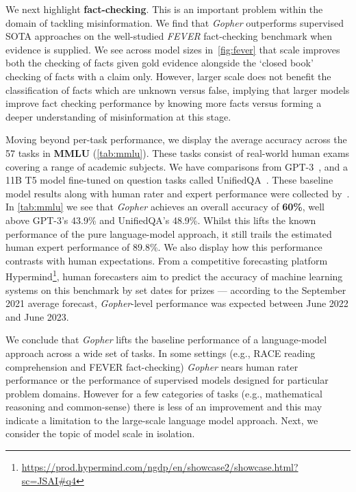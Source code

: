 We next highlight \textbf{fact-checking}. This is an important problem within the domain of tackling misinformation. We find that \textit{Gopher} outperforms supervised SOTA approaches on the well-studied \textit{FEVER} fact-checking benchmark when evidence is supplied. We see across model sizes in~\autoref{fig:fever} that scale improves both the checking of facts given gold evidence alongside the `closed book' checking of facts with a claim only. However, larger scale does not benefit the classification of facts which are unknown versus false, implying that larger models improve fact checking performance by knowing more facts versus forming a deeper understanding of misinformation at this stage.

Moving beyond per-task performance, we display the average accuracy across the 57 tasks in \textbf{MMLU} (\autoref{tab:mmlu}). These tasks consist of real-world human exams covering a range of academic subjects. We have comparisons from GPT-3~\citep{gpt3}, and a 11B T5 model fine-tuned on question tasks called UnifiedQA~\citep{khashabi2020unifiedqa}. These baseline model results along with human rater and expert performance were collected by~\citet{hendrycks2020measuring}. In \autoref{tab:mmlu} we see that \textit{Gopher} achieves an overall accuracy of \textbf{60\%}, well above GPT-3's 43.9\% and UnifiedQA's 48.9\%.
Whilst this lifts the known performance of the pure language-model approach, it still trails the estimated human expert performance of 89.8\%. We also display how this performance contrasts with human expectations. From a competitive forecasting platform Hypermind\footnote{\url{https://prod.hypermind.com/ngdp/en/showcase2/showcase.html?sc=JSAI\#q4}}, human forecasters aim to predict the accuracy of machine learning systems on this benchmark by set dates for prizes --- according to the September 2021 average forecast, \textit{Gopher}-level performance was expected between June 2022 and June 2023.

We conclude that \textit{Gopher} lifts the baseline performance of a language-model approach across a wide set of tasks. In some settings (e.g., RACE reading comprehension and FEVER fact-checking) \textit{Gopher} nears human rater performance or the performance of supervised models designed for particular problem domains. However for a few categories of tasks (e.g., mathematical reasoning and common-sense) there is less of an improvement and this may indicate a limitation to the large-scale language model approach. Next, we consider the topic of model scale in isolation.

